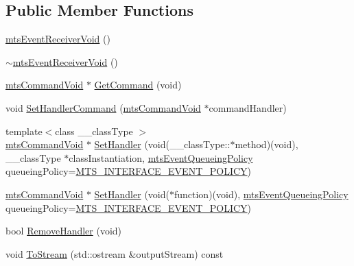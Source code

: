 \subsection*{Public Member Functions}
\begin{DoxyCompactItemize}
\item 
\hyperlink{classmts_event_receiver_void_a211c3ee9432981545d688bf092554813}{mts\-Event\-Receiver\-Void} ()
\item 
\hyperlink{classmts_event_receiver_void_a7c910721b7b8ae3a6b20ba2942da84b8}{$\sim$mts\-Event\-Receiver\-Void} ()
\item 
\hyperlink{classmts_command_void}{mts\-Command\-Void} $\ast$ \hyperlink{classmts_event_receiver_void_aad0d7c5fa7319e95aa7d645b6c5f780d}{Get\-Command} (void)
\item 
void \hyperlink{classmts_event_receiver_void_a43fc8ec1b8ea69fc7cf63d08405114cf}{Set\-Handler\-Command} (\hyperlink{classmts_command_void}{mts\-Command\-Void} $\ast$command\-Handler)
\item 
{\footnotesize template$<$class \-\_\-\-\_\-class\-Type $>$ }\\\hyperlink{classmts_command_void}{mts\-Command\-Void} $\ast$ \hyperlink{classmts_event_receiver_void_afe4089691c2e13f94b76f595976552fb}{Set\-Handler} (void(\-\_\-\-\_\-class\-Type\-::$\ast$method)(void), \-\_\-\-\_\-class\-Type $\ast$class\-Instantiation, \hyperlink{mts_forward_declarations_8h_a9286ac2ca46e5bcd57059550faa96916}{mts\-Event\-Queueing\-Policy} queueing\-Policy=\hyperlink{mts_forward_declarations_8h_a9286ac2ca46e5bcd57059550faa96916a3d4338e85690d50e9ab167be77cdefa0}{M\-T\-S\-\_\-\-I\-N\-T\-E\-R\-F\-A\-C\-E\-\_\-\-E\-V\-E\-N\-T\-\_\-\-P\-O\-L\-I\-C\-Y})
\item 
\hyperlink{classmts_command_void}{mts\-Command\-Void} $\ast$ \hyperlink{classmts_event_receiver_void_ae9253b2d2902daced62c41a9229cf239}{Set\-Handler} (void($\ast$function)(void), \hyperlink{mts_forward_declarations_8h_a9286ac2ca46e5bcd57059550faa96916}{mts\-Event\-Queueing\-Policy} queueing\-Policy=\hyperlink{mts_forward_declarations_8h_a9286ac2ca46e5bcd57059550faa96916a3d4338e85690d50e9ab167be77cdefa0}{M\-T\-S\-\_\-\-I\-N\-T\-E\-R\-F\-A\-C\-E\-\_\-\-E\-V\-E\-N\-T\-\_\-\-P\-O\-L\-I\-C\-Y})
\item 
bool \hyperlink{classmts_event_receiver_void_ae67c66dda217223f31e605f861029f74}{Remove\-Handler} (void)
\item 
void \hyperlink{classmts_event_receiver_void_a81b10b35b461cd995f6cf8e15fd1e1f1}{To\-Stream} (std\-::ostream \&output\-Stream) const 
\end{DoxyCompactItemize}
